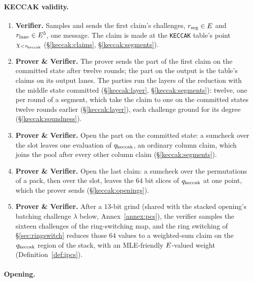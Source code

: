 \paragraph{KECCAK validity.}

\begin{enumerate}
\item \textbf{Verifier.} Samples and sends the first claim's challenges, $r_{\mathrm{seg}}\in E$ and $r_{\mathrm{lane}}\in E^{5}$, one message. The claim is made at the \texttt{KECCAK} table's point $\chi_{<\tau_{\mathrm{keccak}}}$ (\S\ref{keccak:claims}, \S\ref{keccak:segments}).
\item \textbf{Prover \& Verifier.} The prover sends the part of the first claim on the committed state after twelve rounds; the part on the output is the table's claims on its output lanes. The parties run the layers of the reduction with the middle state committed (\S\ref{keccak:layer}, \S\ref{keccak:segments}): twelve, one per round of a segment, which take the claim to one on the committed states twelve rounds earlier (\S\ref{keccak:layer}), each challenge ground for its degree (\S\ref{keccak:soundness}).
\item \textbf{Prover \& Verifier.} Open the part on the committed state: a sumcheck over the slot leaves one evaluation of $q_{\mathrm{keccak}}$, an ordinary column claim, which joins the pool after every other column claim (\S\ref{keccak:segments}).
\item \textbf{Prover \& Verifier.} Open the last claim: a sumcheck over the permutations of a pack, then over the slot, leaves the $64$ bit slices of $q_{\mathrm{keccak}}$ at one point, which the prover sends (\S\ref{keccak:openings}).
\item \textbf{Prover \& Verifier.} After a $13$-bit grind (shared with the stacked opening's batching challenge $\lambda$ below, Annex~\ref{annex:pcs}), the verifier samples the sixteen challenges of the ring-switching map, and the ring switching of \S\ref{sec:ringswitch} reduces those $64$ values to a weighted-sum claim on the $q_{\mathrm{keccak}}$ region of the stack, with an MLE-friendly $E$-valued weight (Definition~\ref{def:ipcs}).
\end{enumerate}

\paragraph{Opening.}

